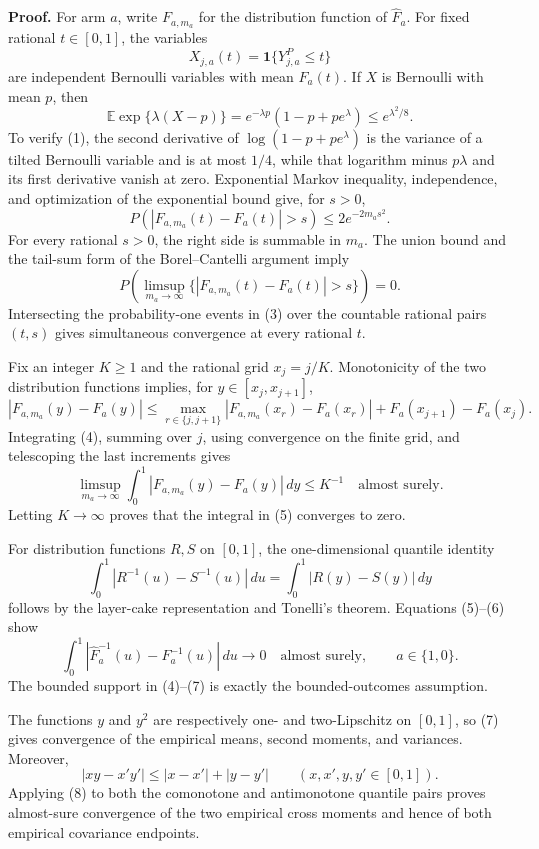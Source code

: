 \textbf{Proof.}
For arm \(a\), write \(F_{a,m_a}\) for the distribution function of \(\widehat F_a\).  For fixed rational \(t\in[0,1]\), the variables
\[
X_{j,a}(t)=\mathbf 1\{Y^P_{j,a}\le t\}
\]
are independent Bernoulli variables with mean \(F_a(t)\).  If \(X\) is Bernoulli with mean \(p\), then
\[
\mathbb E\exp\{\lambda(X-p)\}
=e^{-\lambda p}(1-p+pe^\lambda)\le e^{\lambda^2/8}.
\tag{1}
\]
To verify (1), the second derivative of \(\log(1-p+pe^\lambda)\) is the variance of a tilted Bernoulli variable and is at most \(1/4\), while that logarithm minus \(p\lambda\) and its first derivative vanish at zero.  Exponential Markov inequality, independence, and optimization of the exponential bound give, for \(s>0\),
\[
P\!\left(\left|F_{a,m_a}(t)-F_a(t)\right|>s\right)
\le2e^{-2m_as^2}.
\tag{2}
\]
For every rational \(s>0\), the right side is summable in \(m_a\).  The union bound and the tail-sum form of the Borel--Cantelli argument imply
\[
P\!\left(\limsup_{m_a\to\infty}
\{|F_{a,m_a}(t)-F_a(t)|>s\}\right)=0.
\tag{3}
\]
Intersecting the probability-one events in (3) over the countable rational pairs \((t,s)\) gives simultaneous convergence at every rational \(t\).

Fix an integer \(K\ge1\) and the rational grid \(x_j=j/K\).  Monotonicity of the two distribution functions implies, for \(y\in[x_j,x_{j+1}]\),
\[
|F_{a,m_a}(y)-F_a(y)|
\le
\max_{r\in\{j,j+1\}}|F_{a,m_a}(x_r)-F_a(x_r)|
+F_a(x_{j+1})-F_a(x_j).
\tag{4}
\]
Integrating (4), summing over \(j\), using convergence on the finite grid, and telescoping the last increments gives
\[
\limsup_{m_a\to\infty}
\int_0^1|F_{a,m_a}(y)-F_a(y)|\,dy\le K^{-1}
\quad\text{almost surely}.
\tag{5}
\]
Letting \(K\to\infty\) proves that the integral in (5) converges to zero.

For distribution functions \(R,S\) on \([0,1]\), the one-dimensional quantile identity
\[
\int_0^1|R^{-1}(u)-S^{-1}(u)|\,du
=\int_0^1|R(y)-S(y)|\,dy
\tag{6}
\]
follows by the layer-cake representation and Tonelli's theorem.  Equations (5)--(6) show
\[
\int_0^1|\widehat F_a^{-1}(u)-F_a^{-1}(u)|\,du
\longrightarrow0
\quad\text{almost surely},
\qquad a\in\{1,0\}.
\tag{7}
\]
The bounded support in (4)--(7) is exactly the bounded-outcomes assumption.

The functions \(y\) and \(y^2\) are respectively one- and two-Lipschitz on \([0,1]\), so (7) gives convergence of the empirical means, second moments, and variances.  Moreover,
\[
|xy-x'y'|\le|x-x'|+|y-y'|
\qquad(x,x',y,y'\in[0,1]).
\tag{8}
\]
Applying (8) to both the comonotone and antimonotone quantile pairs proves almost-sure convergence of the two empirical cross moments and hence of both empirical covariance endpoints.


